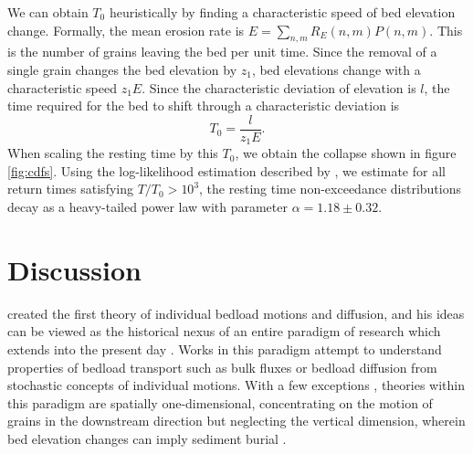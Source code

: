 \documentclass[draft]{agujournal2018}
\newcommand\be{\begin{equation}} %
\newcommand\ee{\end{equation}}   %
\begin{document}
We can obtain $T_0$ heuristically by finding a characteristic speed of bed elevation change.
Formally, the mean erosion rate is $E = \sum_{n,m}R_E(n,m)P(n,m)$.
This is the number of grains leaving the bed per unit time.
Since the removal of a single grain changes the bed elevation by $z_1$, bed elevations change with a characteristic speed $z_1 E$.
Since the characteristic deviation of elevation is $l$, the time required for the bed to shift through a characteristic deviation is
\be T_0 = \frac{l}{z_1 E}.\label{eq:time}\ee
When scaling the resting time by this $T_0$, we obtain the collapse shown in figure \ref{fig:cdfs}.
Using the log-likelihood estimation described by \citet{Newman2005}, we estimate for all return times satisfying $T/T_0 > 10^3$, the resting time non-exceedance distributions decay as a heavy-tailed power law with parameter $\alpha = 1.18 \pm 0.32$.

\section{Discussion}


\citet{Einstein1937} created the first theory of individual bedload motions and diffusion, and his ideas can be viewed as the historical nexus of an entire paradigm of research which extends into the present day \citep[e.g.][]{Hubbell1964,Yano1969, Nakagawa1976,Hassan1991,Ancey2008,Phillips2013,Martin2014, Heyman2016, Bradley2017}.
Works in this paradigm attempt to understand properties of bedload transport such as bulk fluxes or bedload diffusion from stochastic concepts of individual motions.
With a few exceptions \citep[e.g.][]{Yang1971,Nakagawa1980,Wu2019}, theories within this paradigm are spatially one-dimensional, concentrating on the motion of grains in the downstream direction but neglecting the vertical dimension, wherein bed elevation changes can imply sediment burial \citep[e.g.][]{Voepel2013,Martin2014}.
\end{document}
